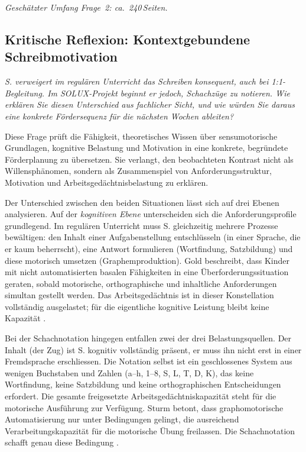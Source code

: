 \documentclass[ngerman, a4paper]{article}
\begin{document}
\textit{Geschätzter Umfang Frage~2: ca.~240\,Seiten.}
 

 

\subsection{Kritische Reflexion: Kontextgebundene Schreibmotivation}


\begin{tcolorbox}[colback=gray!5, colframe=gray!50, title=Weiterführende Diskurslinie]
\itshape
S. verweigert im regulären Unterricht das Schreiben konsequent, auch bei
1:1-Begleitung. Im SOLUX-Projekt beginnt er jedoch, Schachzüge zu notieren.
Wie erklären Sie diesen Unterschied aus fachlicher Sicht, und wie würden Sie
daraus eine konkrete Fördersequenz für die nächsten Wochen ableiten?
\end{tcolorbox}

Diese Frage prüft die Fähigkeit, theoretisches Wissen über sensumotorische
Grundlagen, kognitive Belastung und Motivation in eine konkrete, begründete
Förderplanung zu übersetzen. Sie verlangt, den beobachteten Kontrast nicht als
Willensphänomen, sondern als Zusammenspiel von Anforderungsstruktur, Motivation
und Arbeitsgedächtnisbelastung zu erklären.

Der Unterschied zwischen den beiden Situationen lässt sich auf drei Ebenen
analysieren. Auf der \textit{kognitiven Ebene} unterscheiden sich die
Anforderungsprofile grundlegend. Im regulären Unterricht muss S. gleichzeitig
mehrere Prozesse bewältigen: den Inhalt einer Aufgabenstellung entschlüsseln
(in einer Sprache, die er kaum beherrscht), eine Antwort formulieren
(Wortfindung, Satzbildung) und diese motorisch umsetzen (Graphemproduktion).
Gold beschreibt, dass Kinder mit nicht automatisierten basalen Fähigkeiten in
eine Überforderungssituation geraten, sobald motorische, orthographische und
inhaltliche Anforderungen simultan gestellt werden. Das Arbeitsgedächtnis ist
in dieser Konstellation vollständig ausgelastet; für die eigentliche kognitive
Leistung bleibt keine Kapazität \parencite{gold2018lesenkannmanlernen}.

Bei der Schachnotation hingegen entfallen zwei der drei Belastungsquellen. Der
Inhalt (der Zug) ist S. kognitiv vollständig präsent, er muss ihn nicht erst
in einer Fremdsprache erschliessen. Die Notation selbst ist ein geschlossenes
System aus wenigen Buchstaben und Zahlen (a--h, 1--8, S, L, T, D, K), das keine
Wortfindung, keine Satzbildung und keine orthographischen Entscheidungen
erfordert. Die gesamte freigesetzte Arbeitsgedächtniskapazität steht für die
motorische Ausführung zur Verfügung. Sturm betont, dass graphomotorische
Automatisierung nur unter Bedingungen gelingt, die ausreichend
Verarbeitungskapazität für die motorische Übung freilassen. Die Schachnotation
schafft genau diese Bedingung \parencite{sturm2016graphomotorik}.
\end{document}
